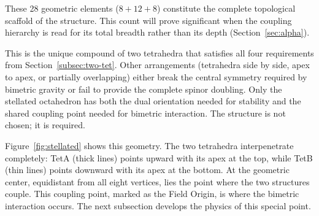 \documentclass[aps,prd,preprint,superscriptaddress,showpacs,preprintnumbers,amsmath,amssymb,nofootinbib]{revtex4-2}
\begin{document}
\noindent
These 28 geometric elements ($8 + 12 + 8$) constitute the complete topological scaffold of the structure. This count will prove significant when the coupling hierarchy is read for its total breadth rather than its depth (Section~\ref{sec:alpha}).

This is the unique compound of two tetrahedra that satisfies all four requirements from Section~\ref{subsec:two-tet}. Other arrangements (tetrahedra side by side, apex to apex, or partially overlapping) either break the central symmetry required by bimetric gravity or fail to provide the complete spinor doubling. Only the stellated octahedron has both the dual orientation needed for stability and the shared coupling point needed for bimetric interaction. The structure is not chosen; it is required.

Figure~\ref{fig:stellated} shows this geometry. The two tetrahedra interpenetrate completely: TetA (thick lines) points upward with its apex at the top, while TetB (thin lines) points downward with its apex at the bottom. At the geometric center, equidistant from all eight vertices, lies the point where the two structures couple. This coupling point, marked as the Field Origin, is where the bimetric interaction occurs. The next subsection develops the physics of this special point.
\end{document}
